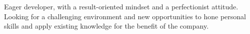 %
%
%

\begin{large}
\par{
    Eager developer, with a result-oriented mindset and a perfectionist attitude. Looking for a challenging environment and new opportunities to hone personal skills and apply existing knowledge for the benefit of the company.
}
\end{large}
\bigskip
